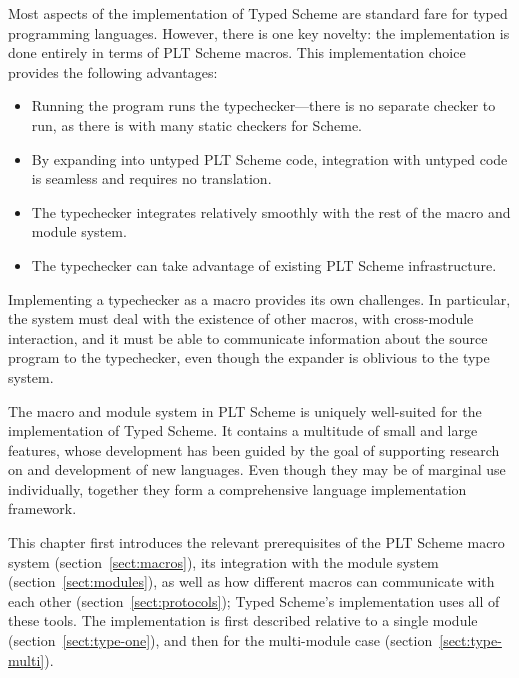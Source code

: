 \begin{schemeregion}

Most aspects of the implementation of Typed Scheme are standard fare
for typed programming languages.  However, there is one key novelty:
the implementation is done entirely in terms of PLT Scheme macros.
This implementation choice provides the following advantages: 

\begin{itemize}
\item Running the program runs the typechecker---there is no separate
  checker to run, as there is with many static checkers for Scheme.
\item By expanding into untyped PLT Scheme code, integration with
  untyped code is seamless and requires no translation.
\item The typechecker integrates relatively smoothly with the rest of the macro
  and module system.
\item The typechecker can take advantage of existing PLT Scheme
  infrastructure. 
\end{itemize}

Implementing a typechecker as a macro provides its own
challenges.  In particular, the system must deal with the existence of
other macros, with cross-module interaction, and it must be able
to communicate information about the source program to the
typechecker, even though the expander is oblivious to the type system.  

The macro and module system in PLT Scheme is uniquely well-suited for
the implementation of Typed Scheme.  It contains a multitude of small
and large features, whose development has been guided by the goal of
supporting research on and development of new languages.  Even though
they may be of marginal use individually, together they form a
comprehensive language implementation framework.

This chapter first introduces the relevant prerequisites of the PLT Scheme macro
system (section~\ref{sect:macros}),
its integration with the module system
(section~\ref{sect:modules}), as well as how different macros can communicate
with each other (section~\ref{sect:protocols}); 
Typed Scheme's implementation uses all of these tools.
  The implementation is first described relative to a
single module (section~\ref{sect:type-one}), and then for the multi-module
case
(section~\ref{sect:type-multi}). 



\end{schemeregion}
